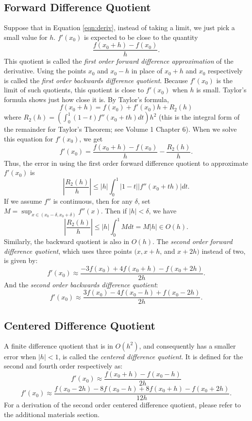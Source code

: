 \subsection*{Forward Difference Quotient} %
%
Suppose that in Equation \eqref{eqn:deriv}, instead of taking a limit, we just pick a small value for $h$.
$f'(x_0)$ is expected to be close to the quantity
%
\begin{equation}\label{equ:forward_diff}
\frac{f(x_0 + h)-f(x_0)}{h}.
\end{equation}
%
This quotient is called the \emph{first order forward difference approximation} of the derivative.
Using the points $x_0$ and $x_0-h$ in place of $x_0+h$ and $x_0$ respectively is called the \emph{first order backwards difference quotient}.
%
Because $f'(x_0)$ is the limit of such quotients, this quotient is close to $f'(x_0)$ when $h$ is small.
Taylor's formula shows just how close it is. By Taylor's formula,
\[
f(x_0+h) = f(x_0) + f'(x_0)h + R_2(h)
\]
where $R_2(h) = \left( \int_0^1 (1-t) f''(x_0+th) dt \right) h^2$
(this is the integral form of the remainder for Taylor's Theorem; see Volume 1 Chapter 6). When we solve this equation for $f'(x_0)$, we get
%
\begin{equation}\label{equ:forward_diff_with_remainder}
f'(x_0) = \frac{f(x_0+h)-f(x_0)}{h} - \frac{R_2(h)}{h}.
\end{equation}
%
Thus, the error in using the first order forward difference quotient to approximate $f'(x_0)$ is
\[
\left | \frac{R_2(h)}{h} \right | \leq |h| \int_0^1 |1 - t||f''(x_0+th)|dt.
\]
If we assume $f''$ is continuous, then for any $\delta$, set $M = \sup_{x \in (x_0-\delta, x_0+\delta)} f''(x)$. Then if $|h| < \delta$, we have
\[
\left | \frac{R_2(h)}{h} \right | \leq |h|\int_0^1 M dt = M|h|  {\in}  O(h).
\]
Similarly, the backward quotient is also in $O(h)$.
%
The \emph{second order forward difference quotient}, which uses three points $(x, x+h$, and $x+2h)$ instead of two, is given by:
%
\begin{equation}
f'(x_0)\approx\frac{-3f(x_0)+4f(x_0+h)-f(x_0+2h)}{2h}.
\end{equation}
And the \emph{second order backwards difference quotient}:
\begin{equation}
f'(x_0)\approx\frac{3f(x_0)-4f(x_0-h)+f(x_0-2h)}{2h}.
\end{equation}
%
\subsection*{Centered Difference Quotient}
%
A finite difference quotient that is in $ O(h^2)$, and consequently has a smaller error when $|h|<1$, is called the \emph{centered difference quotient}. It is defined for the second and fourth order respectively as:
\begin{equation}
f'(x_0)\approx\frac{f(x_0+h)-f(x_0-h)}{2h}
\end{equation}
\begin{equation}
f'(x_0)\approx\frac{f(x_0-2h)-8f(x_0-h)+8f(x_0+h)-f(x_0+2h)}{12h}.
\end{equation}
For a derivation of the second order centered difference quotient, please refer to the additional materials section.

